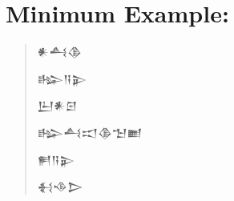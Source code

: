 \documentclass[12pt]{article}
\newcommand{\fsm}{\Large\setmainfont{Akkadian.otf}}
\begin{document}
\section*{Minimum Example:}
\begin{quotation}\fsm
𒀭𒋀𒆠

𒈗𒀀𒉌

𒌨𒀭𒇉

𒈗𒋀𒀊𒆠𒈠𒆤

𒂍𒀀𒉌

𒈬𒈾𒆕
\end{quotation}
\end{document}
